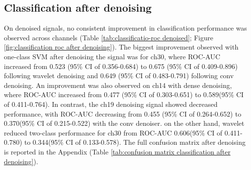 \documentclass[ %
                    author={Rzan Alkabier},
                    supervisor={Dr. Zahraa Abdallah},
                    degree={MSc},
                     title={Denoising Extracellular Recording for Spike Detection and Classification on Single Channels},
                    subtitle={Does denoising improve detection and classification performance?},
                      type={},
                      year={2026}]{dissertation}
\begin{document}
\subsection{Classification after denoising}
On denoised signals, no consistent improvement in classification performance was observed across channels (Table \ref{tab:classificatio-roc denoised}; Figure \ref{fig:classification roc after denoising}). The biggest improvement observed with one-class SVM after denoising the signal was for ch30, where ROC-AUC increased from 0.523 (95\% CI of 0.356-0.684) to 0.675 (95\% CI of 0.409-0.896) following wavelet denoising and 0.649 (95\% CI of 0.483-0.791) following conv denoising. An improvement was also observed on ch14 with dense denoising, where ROC-AUC increased from 0.477 (95\% CI of 0.303-0.651) to 0.589(95\% CI of 0.411-0.764). In contrast, the ch19 denoising signal showed decreased performance, with ROC-AUC decreasing from 0.455 (95\% CI of 0.264-0.652) to 0.370(95\% CI of 0.215-0.522) with the conv denoiser. on the other hand, wavelet reduced two-class performance for ch30 from ROC-AUC 0.606(95\% CI of 0.411-0.780) to 0.344(95\% CI of 0.133-0.578). The full confusion matrix after denoising is reported in the Appendix (Table \ref{tab:confusion matrix classification after denoising}). 
\end{document}
